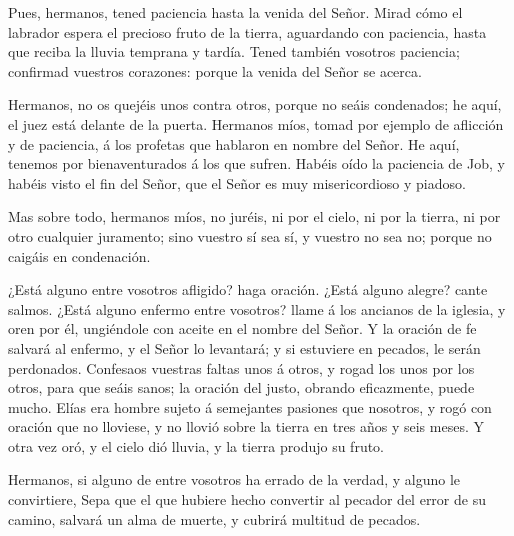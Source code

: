  Pues, hermanos, tened paciencia hasta la venida del Señor.
Mirad cómo el labrador espera el precioso fruto de la tierra, aguardando
con paciencia, hasta que reciba la lluvia temprana y tardía.
 Tened también vosotros paciencia; confirmad vuestros
corazones: porque la venida del Señor se acerca.

 Hermanos, no os quejéis unos contra otros, porque no seáis
condenados; he aquí, el juez está delante de la puerta. 
Hermanos míos, tomad por ejemplo de aflicción y de paciencia, á los
profetas que hablaron en nombre del Señor.  He aquí,
tenemos por bienaventurados á los que sufren. Habéis oído la paciencia
de Job, y habéis visto el fin del Señor, que el Señor es muy
misericordioso y piadoso.

 Mas sobre todo, hermanos míos, no juréis, ni por el cielo,
ni por la tierra, ni por otro cualquier juramento; sino vuestro sí sea
sí, y vuestro no sea no; porque no caigáis en condenación.

 ¿Está alguno entre vosotros afligido? haga oración. ¿Está
alguno alegre? cante salmos.  ¿Está alguno enfermo entre
vosotros? llame á los ancianos de la iglesia, y oren por él, ungiéndole
con aceite en el nombre del Señor.  Y la oración de fe
salvará al enfermo, y el Señor lo levantará; y si estuviere en pecados,
le serán perdonados.  Confesaos vuestras faltas unos á
otros, y rogad los unos por los otros, para que seáis sanos; la oración
del justo, obrando eficazmente, puede mucho.  Elías era
hombre sujeto á semejantes pasiones que nosotros, y rogó con oración que
no lloviese, y no llovió sobre la tierra en tres años y seis meses.
 Y otra vez oró, y el cielo dió lluvia, y la tierra produjo
su fruto.

 Hermanos, si alguno de entre vosotros ha errado de la
verdad, y alguno le convirtiere,  Sepa que el que hubiere
hecho convertir al pecador del error de su camino, salvará un alma de
muerte, y cubrirá multitud de pecados.

